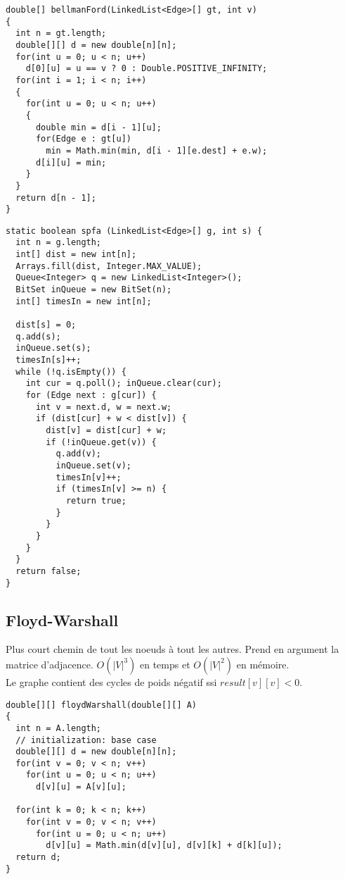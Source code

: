 \begin{lstlisting}
double[] bellmanFord(LinkedList<Edge>[] gt, int v)
{
  int n = gt.length;
  double[][] d = new double[n][n];
  for(int u = 0; u < n; u++)
    d[0][u] = u == v ? 0 : Double.POSITIVE_INFINITY;
  for(int i = 1; i < n; i++)
  {
    for(int u = 0; u < n; u++)
    {
      double min = d[i - 1][u];
      for(Edge e : gt[u])
        min = Math.min(min, d[i - 1][e.dest] + e.w);
      d[i][u] = min;
    }
  }
  return d[n - 1];
}
\end{lstlisting}
\begin{lstlisting}
static boolean spfa (LinkedList<Edge>[] g, int s) {
  int n = g.length;
  int[] dist = new int[n];
  Arrays.fill(dist, Integer.MAX_VALUE);
  Queue<Integer> q = new LinkedList<Integer>();
  BitSet inQueue = new BitSet(n);
  int[] timesIn = new int[n];

  dist[s] = 0;
  q.add(s);
  inQueue.set(s);
  timesIn[s]++;
  while (!q.isEmpty()) {
    int cur = q.poll(); inQueue.clear(cur);
    for (Edge next : g[cur]) {
      int v = next.d, w = next.w;
      if (dist[cur] + w < dist[v]) {
        dist[v] = dist[cur] + w;
        if (!inQueue.get(v)) {
          q.add(v);
          inQueue.set(v);
          timesIn[v]++;
          if (timesIn[v] >= n) {
            return true;
          }
        }
      }
    }
  }
  return false;
}
\end{lstlisting}
\subsection{Floyd-Warshall}
Plus court chemin de tout les noeuds à tout les autres. Prend en argument la matrice d'adjacence. $O(|V|^3)$ en temps et $O(|V|^2)$ en mémoire.\\
Le graphe contient des cycles de poids négatif ssi $result[v][v]<0$.\\

\begin{lstlisting}
double[][] floydWarshall(double[][] A)
{
  int n = A.length;
  // initialization: base case
  double[][] d = new double[n][n];
  for(int v = 0; v < n; v++)
    for(int u = 0; u < n; u++)
      d[v][u] = A[v][u];

  for(int k = 0; k < n; k++)
    for(int v = 0; v < n; v++)
      for(int u = 0; u < n; u++)
        d[v][u] = Math.min(d[v][u], d[v][k] + d[k][u]);
  return d;
}
\end{lstlisting}
